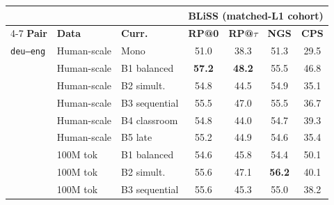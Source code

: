 \documentclass[11pt]{article}
\begin{document}
\begin{table}[!ht]
\centering\scriptsize
\setlength{\tabcolsep}{3pt}
\begin{minipage}[t]{0.49\linewidth}\centering
\begin{tabular}{ll l cccc}
\toprule
& & & \multicolumn{4}{c}{\textbf{BLiSS (matched-L1 cohort)}} \\
\cmidrule(lr){4-7}
\textbf{Pair} & \textbf{Data} & \textbf{Curr.} & \textbf{RP@0} & \textbf{RP@$\tau$} & \textbf{NGS} & \textbf{CPS} \\
\midrule
\texttt{deu--eng} & Human-scale & Mono & \cellcolor[rgb]{0.990,1.000,0.990} 51.0 & \cellcolor[rgb]{1.000,0.887,0.887} 38.3 & \cellcolor[rgb]{0.983,1.000,0.983} 51.3 & \cellcolor[rgb]{1.000,0.774,0.774} 29.5 \\
 & Human-scale & B1 balanced & \cellcolor[rgb]{0.925,1.000,0.925} \textbf{57.2} & \cellcolor[rgb]{1.000,0.983,0.983} \textbf{48.2} & \cellcolor[rgb]{0.927,1.000,0.927} 55.5 & \cellcolor[rgb]{1.000,0.965,0.965} 46.8 \\
 & Human-scale & B2 simult. & \cellcolor[rgb]{0.950,1.000,0.950} 54.8 & \cellcolor[rgb]{1.000,0.947,0.947} 44.5 & \cellcolor[rgb]{0.935,1.000,0.935} 54.9 & \cellcolor[rgb]{1.000,0.836,0.836} 35.1 \\
 & Human-scale & B3 sequential & \cellcolor[rgb]{0.943,1.000,0.943} 55.5 & \cellcolor[rgb]{1.000,0.971,0.971} 47.0 & \cellcolor[rgb]{0.927,1.000,0.927} 55.5 & \cellcolor[rgb]{1.000,0.853,0.853} 36.7 \\
 & Human-scale & B4 classroom & \cellcolor[rgb]{0.950,1.000,0.950} 54.8 & \cellcolor[rgb]{1.000,0.942,0.942} 44.0 & \cellcolor[rgb]{0.938,1.000,0.938} 54.7 & \cellcolor[rgb]{1.000,0.882,0.882} 39.3 \\
 & Human-scale & B5 late & \cellcolor[rgb]{0.946,1.000,0.946} 55.2 & \cellcolor[rgb]{1.000,0.951,0.951} 44.9 & \cellcolor[rgb]{0.939,1.000,0.939} 54.6 & \cellcolor[rgb]{1.000,0.839,0.839} 35.4 \\
\addlinespace[1.5pt]
 & 100M tok & B1 balanced & \cellcolor[rgb]{0.952,1.000,0.952} 54.6 & \cellcolor[rgb]{1.000,0.960,0.960} 45.8 & \cellcolor[rgb]{0.942,1.000,0.942} 54.4 & \cellcolor[rgb]{0.998,1.000,0.998} 50.1 \\
 & 100M tok & B2 simult. & \cellcolor[rgb]{0.942,1.000,0.942} 55.6 & \cellcolor[rgb]{1.000,0.972,0.972} 47.1 & \cellcolor[rgb]{0.918,1.000,0.918} \textbf{56.2} & \cellcolor[rgb]{1.000,0.891,0.891} 40.1 \\
 & 100M tok & B3 sequential & \cellcolor[rgb]{0.942,1.000,0.942} 55.6 & \cellcolor[rgb]{1.000,0.955,0.955} 45.3 & \cellcolor[rgb]{0.934,1.000,0.934} 55.0 & \cellcolor[rgb]{1.000,0.870,0.870} 38.2 \\

\end{tabular}
\end{minipage}
\end{table}
\end{document}
